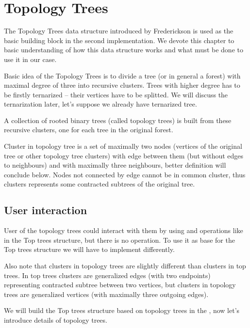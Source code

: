 \chapter{Topology Trees}
\label{chap:TopologyTrees}

The Topology Trees data structure introduced by Frederickson
\cite{DSforDynamicallyMaintainingRootedTrees} is used as the basic building
block in the second implementation. We devote this chapter to basic
understanding of how this data structure works and what must be done to use
it in our case.

Basic idea of the Topology Trees is to divide a tree (or in general a forest)
with maximal degree of three into recursive {\I clusters}. Trees with higher
degree has to be firstly {\I ternarized} -- their vertices have to be splitted.
We will discuss the ternarization later, let's suppose we already have
ternarized tree.

A collection of rooted binary trees (called {\I topology trees}) is built from
these recursive clusters, one for each tree in the original forest.

Cluster in topology tree is a set of maximally two nodes (vertices of the
original tree or other topology tree clusters) with edge between them (but
without edges to neighbours) and with maximally three neighbours, better
definition will conclude below. Nodes not connected by edge cannot be in common
cluster, thus clusters represents some contracted subtrees of the original tree.

\section{User interaction}

User of the topology trees could interact with them by using \Cut{} and \Link{}
operations like in the Top trees structure, but there is no \Expose{} operation.
To use it as base for the Top trees structure we will have to implement
\Expose{} differently.

Also note that clusters in topology trees are slightly different than clusters
in top trees. In top trees clusters are generalized edges (with two endpoints)
representing contracted subtree between two vertices, but clusters in topology
trees are generalized vertices (with maximally three outgoing edges).

We will build the Top trees structure based on topology trees in
the , now let's introduce details of topology
trees.

